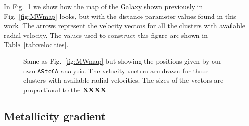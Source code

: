 \documentclass[draft]{aa}
\begin{document}
  In Fig.~\ref{fig:MWmap_vectors} we show how the map of the Galaxy shown
  previously in Fig.~\ref{fig:MWmap} looks, but with the distance parameter
  values found in this work. The arrows represent the velocity vectors for all
  the clusters with available radial velocity. The values used to construct this
  figure are shown in Table~\ref{tab:velocities}.
 

  \begin{figure}
   \caption{Same as Fig.~\ref{fig:MWmap} but showing the positions given by our
   own \texttt{ASteCA} analysis. The velocity vectors are drawn for those
   clusters with available radial velocities. The sizes of the vectors are
   proportional to the \textbf{XXXX}.}
   \label{fig:MWmap_vectors}
  \end{figure}






 \subsection{Metallicity gradient}
  \label{ssec:met_gradient}

\end{document}

